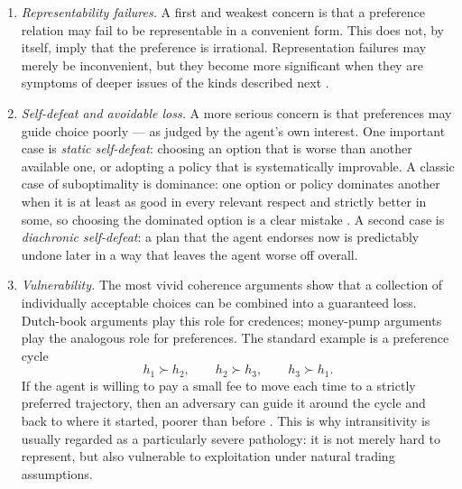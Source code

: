 \documentclass[11pt]{article}
\newcommand{\strictpref}{\succ}
\begin{document}
\begin{enumerate}

\item \textit{Representability failures.}
A first and weakest concern is that a preference relation may fail to be
representable in a convenient form. This does not, by itself, imply that
the preference is irrational. %
Representation failures may merely be inconvenient, but they become more
significant when they are symptoms of deeper issues of the kinds described next
\citep{aumann1962utility,fishburn1970utility}.

\item \textit{Self-defeat and avoidable loss.}
A more serious concern is that preferences may guide choice poorly --- as judged by the
agent's own interest. One important case is \emph{static self-defeat}: choosing an
option that is worse than another available one, or adopting a policy that is
systematically improvable. 
A classic case of suboptimality is dominance: one option or policy dominates
another when it is at least as good in every relevant respect and strictly
better in some, so choosing the dominated option is a clear mistake
\citep{kreps1988notes,mascolell1995micro}. A second case is \emph{diachronic
self-defeat}: a plan that the agent endorses now is predictably
undone later in a way that leaves the agent worse off overall.

\item \textit{Vulnerability.}
The most vivid coherence arguments show that a collection of individually
acceptable choices can be combined into a guaranteed loss. Dutch-book arguments
play this role for credences; money-pump arguments play the analogous role for
preferences. The standard example is a preference cycle
\[
h_1 \strictpref h_2,\qquad h_2 \strictpref h_3,\qquad h_3 \strictpref h_1.
\]
If the agent is willing to pay a small fee to move each time to a strictly
preferred trajectory, then an adversary can guide it around the cycle and back
to where it started, poorer than before \citep{gustafsson2010money}. This is
why intransitivity is usually regarded as a particularly severe pathology: it is
not merely hard to represent, but also vulnerable to exploitation under natural
trading assumptions.

\end{enumerate}
\end{document}
